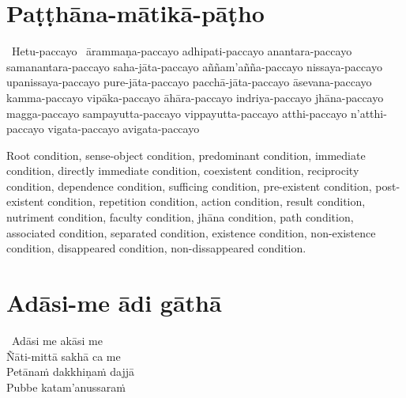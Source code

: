 \suttaRef{[SN 12.1]}



\section{Paṭṭhāna-mātikā-pāṭho}
\label{patthana-matika-patho}

\begin{pali-hangtogether}
  \anglebracketleft\ \hspace{-0.5mm}Hetu-paccayo \hspace{-0.5mm}\anglebracketright\ ārammaṇa-paccayo adhipati-paccayo anantara-paccayo samanantara-paccayo saha-jāta-paccayo aññam'añña-paccayo nissaya-paccayo upanissaya-paccayo pure-jāta-paccayo pacchā-jāta-paccayo āsevana-paccayo kamma-paccayo vipāka-paccayo āhāra-paccayo indriya-paccayo jhāna-paccayo magga-paccayo sampayutta-paccayo vippayutta-paccayo atthi-paccayo n'atthi-paccayo vigata-paccayo avigata-paccayo
\end{pali-hangtogether}

\begin{english-hang-verses}
  Root condition, sense-object condition, predominant condition, immediate condition, directly immediate condition, coexistent condition, reciprocity condition, dependence condition, sufficing condition, pre-existent condition, post-existent condition, repetition condition, action condition, result condition, nutriment condition, faculty condition, jhāna condition, path condition, associated condition, separated condition, existence condition, non-existence condition, disappeared condition, non-dissappeared condition.
\end{english-hang-verses}

\suttaRef{[Dhs A]}



\section{Adāsi-me ādi gāthā}
\label{adasi-me-adi-gatha}

\begin{pali-hangtogether}
  \anglebracketleft\ \hspace{-0.5mm}Adāsi me akāsi me \hspace{-0.5mm}\anglebracketright\ \\
  Ñāti-mittā sakhā ca me\\
  Petānaṁ dakkhiṇaṁ dajjā\\
  Pubbe katam'anussaraṁ
\end{pali-hangtogether}

